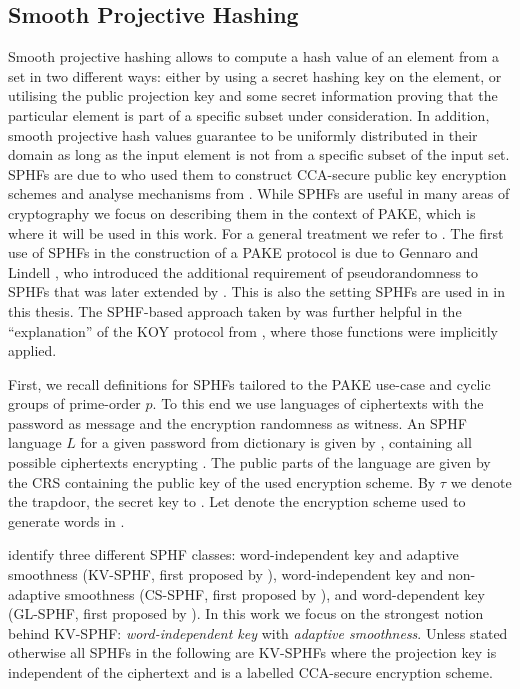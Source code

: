 \subsection{Smooth Projective Hashing} \label{sec:prelims-sphf}
Smooth projective hashing allows to compute a hash value of an element from a set in two different ways:
either by using a secret hashing key on the element, or utilising the public projection key and some secret information proving that the particular element is part of a specific subset under consideration.
In addition, smooth projective hash values guarantee to be uniformly distributed in their domain as long as the input element is not from a specific subset of the input set.
\acp{SPHF} are due to \citet{Cramer2002} who used them to construct \ac{CCA}-secure public key encryption schemes and analyse mechanisms from \citet{Cramer1998}.
While \acp{SPHF} are useful in many areas of cryptography we focus on describing them in the context of \ac{PAKE}, which is where it will be used in this work.
For a general treatment we refer to \cite{Cramer2002,cryptoeprint:2013:034}.
The first use of \acp{SPHF} in the construction of a \ac{PAKE} protocol is due to Gennaro and Lindell \cite{Gennaro2003}, who introduced the additional requirement of pseudorandomness to \acp{SPHF} that was later extended by \citet{Katz2011}.
This is also the setting \acp{SPHF} are used in in this thesis.
The \ac{SPHF}-based approach taken by \citet{Gennaro2003} was further helpful in the ``explanation'' of the KOY protocol from \citet{KatzOY01}, where those functions were implicitly applied.

First, we recall definitions for \acp{SPHF} tailored to the \ac{PAKE} use-case and cyclic groups \GG of prime-order $p$.
To this end we use languages of ciphertexts with the password as message and the encryption randomness as witness.
An \ac{SPHF} language $L$ for a given password \pwd from dictionary \cD is given by \Lpwd, containing all possible ciphertexts encrypting \pwd. 
The public parts of the language are given by the \acl{CRS} \crs containing the public key \pk of the used encryption scheme.
By $\tau$ we denote the \crs trapdoor, the secret key to \pk.
Let \cL denote the encryption scheme used to generate words in \Lpwd.

\citet{Benhamouda2013} identify three different \ac{SPHF} classes:
word-independent key and adaptive smoothness (KV-SPHF, first proposed by \citet{Katz2011}),
word-independent key and non-adaptive smoothness (CS-SPHF, first proposed by \citet{Cramer2002}),
and word-dependent key (GL-SPHF, first proposed by \citet{Gennaro2003}).
In this work we focus on the strongest notion behind KV-SPHF: \emph{word-independent key} with \emph{adaptive smoothness}.
Unless stated otherwise all \acp{SPHF} in the following are KV-SPHFs where the projection key is independent of the ciphertext and \cL is a labelled CCA-secure encryption scheme.


